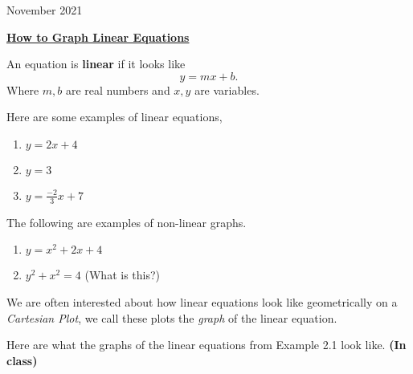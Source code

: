 \documentclass[12pt,oneside]{book} %
\begin{document}
	\renewcommand*{\term}{Term 2} %
	\renewcommand*{\coursecode}{MCR3U} %
	\renewcommand*{\thelecnum}{2} %
	\renewcommand*{\coursename}{Course Name} %
	\renewcommand*{\profname}{Prof Name} %
	\renewcommand*{\colink}{http://www.student.math.uwaterloo.ca/~c2kent} %
	\clearpage
\begin{lec}{November 2021}
	\begin{center}
		\Huge{\underline{\textbf{How to Graph Linear Equations}}}
	\end{center}

	\vspace*{0.5cm}

	\begin{mdframed}
		\begin{defn}
			An equation is \textbf{linear} if it looks like
			\[
						y = mx+ b
			.\] 
			Where $m,b$ are real numbers and $x,y$ are variables.
		\end{defn}
	\end{mdframed}
	\begin{ex}
		Here are some examples of linear equations,
		\begin{enumerate}
			\item $y = 2x + 4$
			\item $y = 3$
			\item $y = \frac{-2}{3}x + 7$
		\end{enumerate}
	\end{ex}
	\begin{ex}
		The following are examples of non-linear graphs.
		\begin{enumerate}
			\item $y = x^2 + 2x + 4$
			\item $y^2 + x^2 = 4$ (What is this?)
		\end{enumerate}
	\end{ex}
	We are often interested about how linear equations look like geometrically on a \emph{Cartesian Plot}, we call these plots the
	\emph{graph} of the linear equation.
	\begin{ex}
		Here are what the graphs of the linear equations from Example 2.1 look like. \textbf{(In class)}
	\end{ex}



\end{lec}
\end{document}
